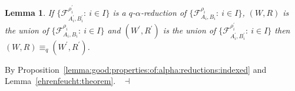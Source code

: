 \documentclass[draft]{article}
\newtheorem{lemma}{Lemma}
\newenvironment{proof}{{\bf Proof:}}{~$\dashv$\\}
\def\N{\mathbb{N}}
\begin{document}
\begin{lemma}\label{lemma:alpha:reduction:fol}
%
%
If $\{{\mathcal F}_{A_{i}^{\prime},B_{i}^{\prime}}^{\rho_{i}^{\prime}}:\ i{\in}I\}$ is a $q$-$\alpha$-reduction of $\{{\mathcal F}_{A_{i},B_{i}}^{\rho_{i}}:\ i{\in}I\}$, $(W,R)$ is the union of $\{{\mathcal F}_{A_{i},B_{i}}^{\rho_{i}}:\ i{\in}I\}$ and $(W^{\prime},R^{\prime})$ is the union of $\{{\mathcal F}_{A_{i}^{\prime},B_{i}^{\prime}}^{\rho_{i}^{\prime}}:\ i{\in}I\}$ then $(W,R){\equiv_{q}}(W^{\prime},R^{\prime})$.
%
%
\end{lemma}
%
%
\begin{proof}
%
%
By Proposition~\ref{lemma:good:properties:of:alpha:reductions:indexed} and Lemma~\ref{ehrenfeucht:theorem}.
%
%
\medskip
%
%
\end{proof}
%
%
%
%
%
%
%
%
\end{document}

